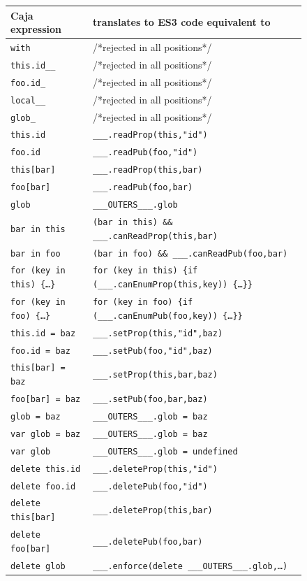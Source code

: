\documentclass[letterpaper,twocolumn,10pt]{article}
\newcommand{\code}[1]{{\tt {#1}}}              %
\begin{document}
\begin{figure}
\begin{tabular}{ll}
  Caja expression    & translates to ES3 code equivalent to\\ 
  \hline
  \code{with}        & /*rejected in all positions*/ \\
  \hline
  \code{this.id\_\_} & /*rejected in all positions*/ \\
  \code{foo.id\_}    & /*rejected in all positions*/ \\      
  \code{local\_\_}   & /*rejected in all positions*/ \\        
  \code{glob\_}      & /*rejected in all positions*/ \\        
  \hline
  \code{this.id}     & \code{\_\_\_.readProp(this,"id")}\\
  \code{foo.id}      & \code{\_\_\_.readPub(foo,"id")} \\
  \code{this[bar]}   & \code{\_\_\_.readProp(this,bar)} \\
  \code{foo[bar]}    & \code{\_\_\_.readPub(foo,bar)}  \\
  \code{glob}        & \code{\_\_\_OUTERS\_\_\_.glob} \\
  \hline
  \code{bar in this}           
    & \code{(bar in this) \&\& \_\_\_.canReadProp(this,bar)} \\
  \code{bar in foo}            
    & \code{(bar in foo) \&\& \_\_\_.canReadPub(foo,bar)} \\
  \code{for (key in this)\ \{\ldots\}} 
    &\code{for (key in this)
     \{if (\_\_\_.canEnumProp(this,key))\ \{\ldots\}\}}\\
  \code{for (key in foo)\ \{\ldots\}}  
    & \code{for (key in foo)
     \{if (\_\_\_.canEnumPub(foo,key))\ \{\ldots\}\}} \\
  \hline
  \code{this.id = baz}    & \code{\_\_\_.setProp(this,"id",baz)} \\
  \code{foo.id = baz}     & \code{\_\_\_.setPub(foo,"id",baz)} \\
  \code{this[bar] = baz}  & \code{\_\_\_.setProp(this,bar,baz)} \\
  \code{foo[bar] = baz}   & \code{\_\_\_.setPub(foo,bar,baz)} \\
  \code{glob = baz}       & \code{\_\_\_OUTERS\_\_\_.glob = baz} \\
  \code{var glob = baz}   & \code{\_\_\_OUTERS\_\_\_.glob = baz} \\
  \code{var glob}         & \code{\_\_\_OUTERS\_\_\_.glob = undefined} \\
  \hline               
  \code{delete this.id}   & \code{\_\_\_.deleteProp(this,"id")} \\
  \code{delete foo.id}    & \code{\_\_\_.deletePub(foo,"id")} \\
  \code{delete this[bar]} & \code{\_\_\_.deleteProp(this,bar)} \\
  \code{delete foo[bar]}  & \code{\_\_\_.deletePub(foo,bar)} \\
  \code{delete glob}      
         & \code{\_\_\_.enforce(delete \_\_\_OUTERS\_\_\_.glob,\ldots)} \\
\end{tabular}


\end{figure}
\end{document}

